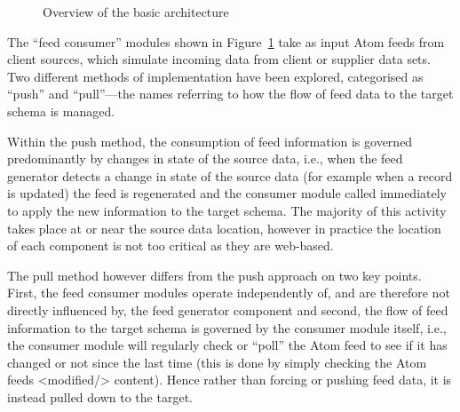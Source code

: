 \documentclass{CRPITStyle}
\begin{document}
\begin{figure}[htb]
	\caption{Overview of the basic architecture}
	\label{fig-basic}
\end{figure}


The ``feed consumer'' modules shown in Figure~\ref{fig-basic} take as
input Atom feeds from client sources, which simulate incoming data from
client or supplier data sets. Two different methods of implementation
have been explored, categorised as ``push'' and ``pull''---the names
referring to how the flow of feed data to the target schema is managed.

Within the push method, the consumption of feed information is governed
predominantly by changes in state of the source data, i.e., when the feed
generator detects a change in state of the source data (for example when
a record is updated) the feed is regenerated and the consumer module
called immediately to apply the new information to the target schema. 
The majority of this activity takes place at or near the source data location,
however in practice the location of each component is not too critical as
they are web-based.

The pull method however differs from the push approach on two
key points. First, the feed consumer modules operate independently of,
and are therefore not directly influenced by, the feed generator
component and second, the flow of feed information to the target schema
is governed by the consumer module itself, i.e., the consumer module
will regularly check or ``poll'' the Atom feed to see if it has changed
or not since the last time (this is done by simply checking the Atom
feeds <modified/> content). Hence rather than forcing or pushing feed
data, it is instead pulled down to the target.
\end{document}
